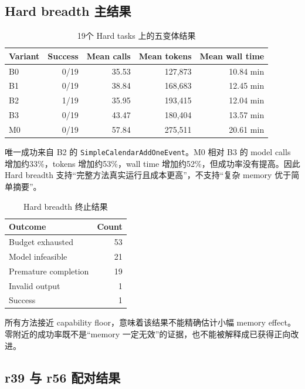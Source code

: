 \documentclass[12pt,a4paper]{ctexart}
\newcommand{\code}[1]{\texttt{#1}}
\begin{document}
\subsection{Hard breadth 主结果}

\begin{table}[H]
    \centering
    \caption{19个 Hard tasks 上的五变体结果}
    \label{tab:hard-results}
    \small
    \begin{tabularx}{\textwidth}{p{1.5cm}rrrr}
        \toprule
        Variant & Success & Mean calls & Mean tokens & Mean wall time \\
        \midrule
        B0 & 0/19 & 35.53 & 127,873 & 10.84 min \\
        B1 & 0/19 & 38.84 & 168,683 & 12.45 min \\
        B2 & 1/19 & 35.95 & 193,415 & 12.04 min \\
        B3 & 0/19 & 43.47 & 180,404 & 13.57 min \\
        M0 & 0/19 & 57.84 & 275,511 & 20.61 min \\
        \bottomrule
    \end{tabularx}
\end{table}

唯一成功来自 B2 的 \code{SimpleCalendarAddOneEvent}。M0 相对 B3 的 model calls 增加约33\%，tokens 增加约53\%，wall time 增加约52\%，但成功率没有提高。因此 Hard breadth 支持“完整方法真实运行且成本更高”，不支持“复杂 memory 优于简单摘要”。

\begin{table}[H]
    \centering
    \caption{Hard breadth 终止结果}
    \label{tab:outcomes}
    \small
    \begin{tabularx}{0.72\textwidth}{Y r}
        \toprule
        Outcome & Count \\
        \midrule
        Budget exhausted & 53 \\
        Model infeasible & 21 \\
        Premature completion & 19 \\
        Invalid output & 1 \\
        Success & 1 \\
        \bottomrule
    \end{tabularx}
\end{table}

所有方法接近 capability floor，意味着该结果不能精确估计小幅 memory effect。零附近的成功率既不是“memory 一定无效”的证据，也不能被解释成已获得正向改进。

\subsection{r39 与 r56 配对结果}
\end{document}
